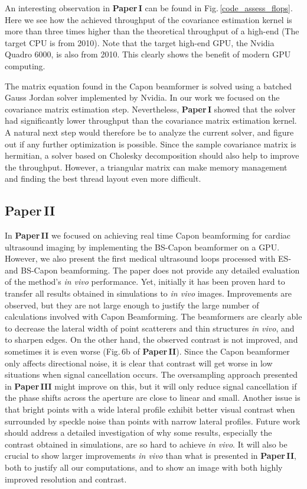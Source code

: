 An interesting observation in \textbf{Paper\,I} can be found in Fig.\,\ref{code_assess_flops}. Here we see how the achieved throughput of the covariance estimation kernel is more than three times higher than the theoretical throughput of a high-end  (The target CPU is from 2010). Note that the target high-end GPU, the Nvidia Quadro 6000, is also from 2010. This clearly shows the benefit of modern GPU computing.

The matrix equation found in the Capon beamformer is solved using a batched Gauss Jordan solver implemented by Nvidia. In our work we focused on the covariance matrix estimation step. Nevertheless, \textbf{Paper\,I} showed that the solver had significantly lower throughput than the covariance matrix estimation kernel. A natural next step would therefore be to analyze the current solver, and figure out if any further optimization is possible. Since the sample covariance matrix is hermitian, a solver based on Cholesky decomposition should also help to improve the throughput. However, a triangular matrix can make memory management and finding the best thread layout even more difficult. 

\subsection{Paper\,II}
In \textbf{Paper\,II} we focused on achieving real time Capon beamforming for cardiac ultrasound imaging by implementing the BS-Capon beamformer on a GPU. However, we also present the first medical ultrasound loops processed with ES- and BS-Capon beamforming.  The paper does not provide any detailed evaluation of the method's \textit{in vivo} performance. Yet, initially it has been proven hard to transfer all results obtained in simulations to \textit{in vivo} images. Improvements are observed, but they are not large enough to justify the large number of calculations involved with Capon Beamforming. The beamformers are clearly able to decrease the lateral width of point scatterers and thin structures \textit{in vivo}, and to sharpen edges. On the other hand, the observed contrast is not improved, and sometimes it is even worse (Fig.\,6b of \textbf{Paper\,II}). Since the Capon beamformer only affects directional noise, it is clear that contrast will get worse in low  situations when signal cancellation occurs. The oversampling approach presented in \textbf{Paper\,III} might improve on this, but it will only reduce signal cancellation if the phase shifts across the aperture are close to linear and small. Another issue is that bright points with a wide lateral profile exhibit better visual contrast when surrounded by speckle noise than points with narrow lateral profiles. Future work should address a detailed investigation of why some results, especially the contrast obtained in simulations, are so hard to achieve \textit{in vivo}. It will also be crucial to show larger improvements \textit{in vivo} than what is presented in \textbf{Paper\,II}, both to justify all our computations, and to show an image with both highly improved resolution and contrast. 

